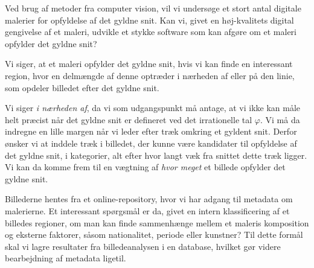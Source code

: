 Ved brug af metoder fra computer vision, vil vi undersøge et stort antal
digitale malerier for opfyldelse af det gyldne snit. Kan vi, givet en
høj-kvalitets digital gengivelse af et maleri, udvikle et stykke software som
kan afgøre om et maleri opfylder det gyldne snit?

Vi siger, at et maleri opfylder det gyldne snit, hvis vi kan finde en
interessant region, hvor en delmængde af denne optræder i nærheden af
eller på den linie, som opdeler billedet efter det gyldne snit.

Vi siger \emph{i nærheden af}, da vi som udgangspunkt må antage, at
vi ikke kan måle helt præcist når det gyldne snit er defineret ved det
irrationelle tal $\varphi$. Vi må da indregne en lille margen når vi
leder efter træk omkring et gyldent snit.  Derfor ønsker vi at inddele
træk i billedet, der kunne være kandidater til opfyldelse af det gyldne
snit, i kategorier, alt efter hvor langt væk fra snittet dette træk
ligger. Vi kan da komme frem til en vægtning af \emph{hvor meget} et
billede opfylder det gyldne snit.

Billederne hentes fra et online-repository, hvor vi har adgang til metadata om
malerierne. Et interessant spørgsmål er da, givet en intern klassificering af
et billedes regioner, om man kan finde sammenhænge mellem et maleris
komposition og eksterne faktorer, såsom nationalitet, periode eller kunstner?
Til dette formål skal vi lagre resultater fra billedeanalysen i en database,
hvilket gør videre bearbejdning af metadata ligetil.
